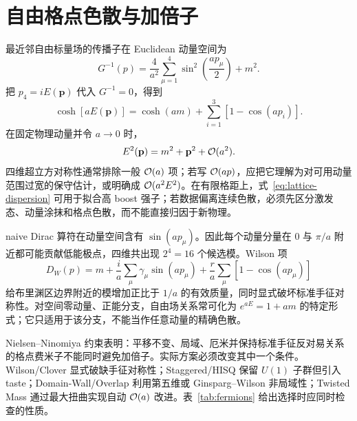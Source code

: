 \section{自由格点色散与加倍子}

最近邻自由标量场的传播子在 Euclidean 动量空间为
\begin{equation}
  G^{-1}(p)=\frac4{a^2}\sum_{\mu=1}^4\sin^2\!\left(\frac{ap_\mu}{2}\right)+m^2.
  \label{eq:scalar-propagator}
\end{equation}
把 \(p_4=iE(\mathbf p)\) 代入 \(G^{-1}=0\)，得到
\begin{equation}
  \cosh[aE(\mathbf p)]
  =\cosh(am)+\sum_{i=1}^3\left[1-\cos(ap_i)\right].
  \label{eq:lattice-dispersion}
\end{equation}
在固定物理动量并令 \(a\to0\) 时，
\begin{equation}
  E^2(\mathbf p)=m^2+\mathbf p^2+\mathcal{O}(a^2).
  \label{eq:continuum-dispersion}
\end{equation}
四维超立方对称性通常排除一般 \(\mathcal{O}(a)\) 项；若写 \(\mathcal{O}(ap)\)，应把它理解为对可用动量范围过宽的保守估计，或明确成 \(\mathcal{O}(a^2E^2)\)。在有限格距上，式~\eqref{eq:lattice-dispersion} 可用于拟合高 boost 强子；若数据偏离连续色散，必须先区分激发态、动量涂抹和格点色散，而不能直接归因于新物理。

naive Dirac 算符在动量空间含有 \(\sin(ap_\mu)\)。因此每个动量分量在 \(0\) 与 \(\pi/a\) 附近都可能贡献低能极点，四维共出现 \(2^4=16\) 个候选模。Wilson 项
\begin{equation}
  D_W(p)=m+\frac{i}{a}\sum_\mu\gamma_\mu\sin(ap_\mu)
  +\frac{r}{a}\sum_\mu\left[1-\cos(ap_\mu)\right]
  \label{eq:wilson-dirac}
\end{equation}
给布里渊区边界附近的模增加正比于 \(1/a\) 的有效质量，同时显式破坏标准手征对称性。对空间零动量、正能分支，自由场关系常可化为 \(e^{aE}=1+am\) 的特定形式；它只适用于该分支，不能当作任意动量的精确色散。

Nielsen--Ninomiya 约束表明：平移不变、局域、厄米并保持标准手征反对易关系的格点费米子不能同时避免加倍子。实际方案必须改变其中一个条件。Wilson/Clover 显式破缺手征对称性；Staggered/HISQ 保留 \(U(1)\) 子群但引入 taste；Domain-Wall/Overlap 利用第五维或 Ginsparg--Wilson 非局域性；Twisted Mass 通过最大扭曲实现自动 \(\mathcal{O}(a)\) 改进。表~\ref{tab:fermions} 给出选择时应同时检查的性质。

